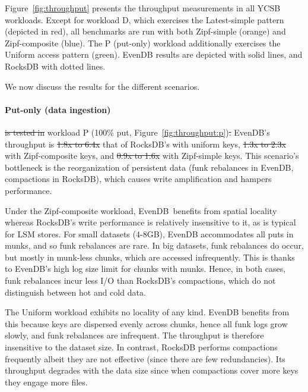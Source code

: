 \documentclass[sigplan,10pt]{acmart}
\newcommand{\sys}{EvenDB}
\providecommand{\DIFadd}[1]{{\protect\color{blue}\uwave{#1}}} %
\providecommand{\DIFdel}[1]{{\protect\color{red}\sout{#1}}}                      %
\providecommand{\DIFaddbegin}{} %
\providecommand{\DIFaddend}{} %
\providecommand{\DIFdelbegin}{} %
\providecommand{\DIFdelend}{} %
\begin{document}
Figure~\ref{fig:throughput} presents the throughput measurements in all YCSB workloads. 
Except for workload D, which exercises the Latest-simple pattern
(depicted in red), all benchmarks are run with both  Zipf-simple (orange) 
and Zipf-composite (blue). The P (put-only) workload 
additionally exercises the Uniform access pattern (green). \sys\/ results are depicted with solid
lines, and RocksDB with dotted lines. 

We now discuss the results for the different scenarios.

\paragraph{Put-only (data ingestion)\DIFaddbegin \DIFadd{.}\DIFaddend } \DIFdelbegin \DIFdel{is tested in }\DIFdelend \DIFaddbegin \DIFadd{In }\DIFaddend workload {P} (100\% put, Figure~\ref{fig:throughput:p})\DIFdelbegin \DIFdel{. 
}\DIFdelend \DIFaddbegin \DIFadd{, 
}\DIFaddend \sys's throughput is \DIFdelbegin \DIFdel{1.8x to 6.4x }\DIFdelend \DIFaddbegin \DIFadd{$1.8\times$ to $6.4\times$ }\DIFaddend that of RocksDB's with uniform keys, \DIFdelbegin \DIFdel{1.3x to 2.3x }\DIFdelend \DIFaddbegin \DIFadd{$1.3\times$ to $2.3\times$ }\DIFaddend with Zipf-composite keys, 
and \DIFdelbegin \DIFdel{0.9x to 1.6x }\DIFdelend \DIFaddbegin \DIFadd{$0.9\times$ to $1.6\times$ }\DIFaddend with Zipf-simple keys. This scenario's bottleneck is the reorganization of persistent data  
(funk rebalances in \sys, compactions in RocksDB), which causes write amplification and hampers performance. 

 Under the Zipf-composite workload, \sys\ benefits from spatial locality whereas RocksDB's write performance 
 is relatively insensitive to it, as is typical for LSM stores. For small datasets (4-8GB), \sys\/ accommodates 
all puts in munks, and so funk rebalances are rare. In big datasets, funk rebalances do occur, but mostly in 
munk-less chunks, which are accessed infrequently. This is thanks to \sys\/'s high log size limit for chunks 
with munks. Hence, in both cases, funk rebalances incur less I/O than RocksDB's compactions, 
which do not distinguish between hot and cold data. 


The Uniform workload exhibits no locality of any kind. 
 \sys\/ benefits from this because keys are dispersed evenly across chunks, hence all funk logs grow 
 slowly, and funk rebalances are infrequent. The throughput is therefore insensitive to the dataset 
 size. In contrast, RocksDB performs compactions frequently albeit they are not effective (since there are few redundancies). Its throughput 
 degrades  with the data size since when compactions cover more keys they engage more files.
\end{document}
